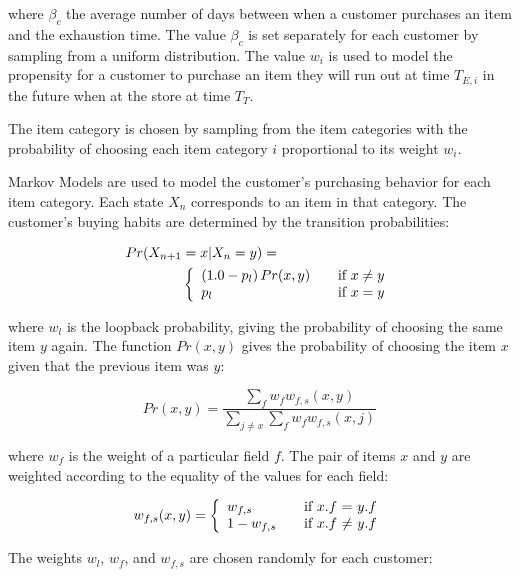 \documentclass[conference]{IEEEtran}
\begin{document}
where $\beta_c$ the average number of days between when a customer purchases an item and the exhaustion time. The value $\beta_c$ is set separately for each customer by sampling from a uniform distribution. The value $w_i$ is used to model the propensity for a customer to purchase an item they will run out at time $T_{E, i}$ in the future when at the store at time $T_T$.

The item category is chosen by sampling from the item categories with the probability of choosing each item category $i$ proportional to its weight $w_i$.

Markov Models are used to model the customer's purchasing behavior for each item category.  Each state $X_n$ corresponds to an item in that category. The customer's buying habits are determined by the transition probabilities:  

\begin{align}
Pr(X_{n+1}&=x|X_n=y) = \nonumber \\
& \left\{ 
  \begin{array}{l l}
   (1.0 - p_l) \, Pr(x,y)  & \quad \text{if $x \neq y$}\\
   p_l & \quad \text{if $x = y$}
  \end{array} \right.
\end{align}

where $w_l$ is the loopback probability, giving the probability of choosing the same item $y$ again. The function $Pr(x,y)$ gives the probability of choosing the item $x$ given that the previous item was $y$:

\begin{equation*}
Pr(x,y) = \frac{\sum_f w_f w_{f,s}(x, y)}{\sum_{j \neq x} \sum_f w_f w_{f,s}(x, j)}
\end{equation*}

where $w_f$ is the weight of a particular field $f$.   The pair of items $x$ and $y$ are weighted  according to the equality of the values for each field:

\begin{equation*}
w_{f,s}(x,y) = \left\{ 
  \begin{array}{l l}
   w_{f,s}  & \quad \text{if $x$.$f$ = $y$.$f$}\\
   1 - w_{f, s} & \quad \text{if $x$.$f$ $\neq$ $y$.$f$}
  \end{array} \right.
\end{equation*} 

The weights $w_l$, $w_f$, and $w_{f, s}$ are chosen randomly for each customer:
\end{document}
